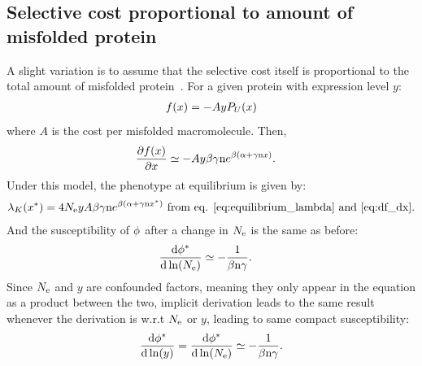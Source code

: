 \subsection{Selective cost proportional to amount of misfolded protein}
A slight variation is to assume that the selective cost itself is proportional to the total amount of misfolded protein~\citep{Drummond2005a, Wilke2006, Drummond2008, Serohijos2012}. For a given protein with expression level $y$:
\begin{align}
f (x) = - A y P_{U} (x)
\end{align}
where $A$ is the cost per misfolded macromolecule. Then, 
\begin{align}
\frac{\partial  f (x)}{\partial x} & \simeq -A y \beta \gamma \text{n} e^{\beta(\alpha + \gamma \text{n} x)}.
\end{align}
Under this model, the phenotype at equilibrium is given by:
\begin{align}
\lambda_{K}(x^{*}) = 4N_{\mathrm{e}} y A \beta \gamma \text{n} e^{\beta(\alpha + \gamma \text{n} x^{*})} \text{ from eq. \ref{eq:equilibrium_lambda} and \ref{eq:df_dx}}.
\end{align}
And the susceptibility of $\phi$ after a change in $N_{\mathrm{e}}$ is the same as before:
\begin{align}
\frac{ \mathrm{d} \phi^{*}}{\mathrm{d} \ln (N_{\mathrm{e}})} & \simeq - \frac{1}{\beta \text{n} \gamma}.
\end{align}
Since $N_{\mathrm{e}}$ and $y$ are confounded factors, meaning they only appear in the equation as a product between the two, implicit derivation leads to the same result whenever the derivation is w.r.t $N_{\mathrm{e}}$ or $y$, leading to same compact susceptibility:
\begin{align}
\frac{ \mathrm{d} \phi^{*}}{\mathrm{d} \ln (y)} = \frac{ \mathrm{d} \phi^{*}}{\mathrm{d} \ln (N_{\mathrm{e}})} \simeq - \frac{1}{\beta \text{n} \gamma}.
\end{align}

